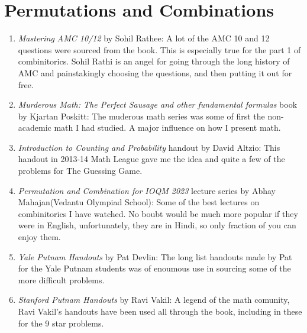\section{Permutations and Combinations}
\begin{enumerate}
    \item \emph{Mastering AMC 10/12} by Sohil Rathee: A lot of the AMC 10 and 12 questions were sourced from the book. This is especially true for the part 1 of combinitorics. Sohil Rathi is an angel for going through the long history of AMC and painstakingly choosing the questions, and then putting it out for free.
    \item  \emph{Murderous Math: The Perfect Sausage and other fundamental formulas} book by Kjartan Poskitt: The muderous math series was some of first the non-academic math I had studied. A major influence on how I present math. 
    \item \emph{Introduction to Counting and Probability} handout by David Altzio: This handout in 2013-14 Math League gave me the idea and quite a few of the problems for The Guessing Game.
    \item  \emph{Permutation and Combination for IOQM 2023} lecture series by Abhay Mahajan(Vedantu Olympiad School): Some of the best lectures on combinitorics I have watched. No boubt would be much more popular if they were in English, unfortunately, they are in Hindi, so only fraction of you can enjoy them.
    \item \emph{Yale Putnam Handouts} by Pat Devlin: The long list handouts made by Pat for the Yale Putnam students was of enoumous use in sourcing some of the more difficult problems.
    \item \emph{Stanford Putnam Handouts} by Ravi Vakil: A legend of the math comunity, Ravi Vakil's handouts have been used all through the book, including in these for the 9 star problems.
\end{enumerate}
